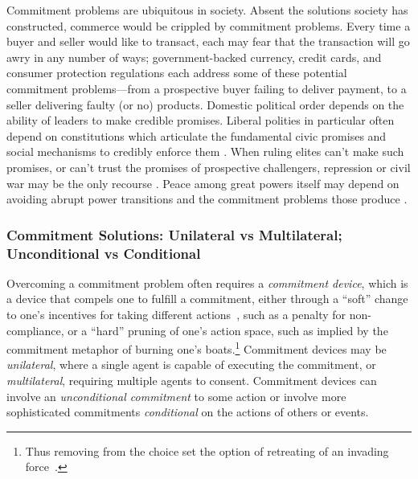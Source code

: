 \documentclass[11pt, a4paper, logo, onecolumn, nonumbering]{deepmind}
\newcommand{\bnote}[1]{}
\begin{document}
Commitment problems are ubiquitous in society. Absent the solutions society has constructed, commerce would be crippled by commitment problems. Every time a buyer and seller would like to transact, each may fear that the transaction will go awry in any number of ways; government-backed currency, credit cards, and consumer protection regulations each address some of these potential commitment problems---from a prospective buyer failing to deliver payment, to a seller delivering faulty (or no) products. %
Domestic political order depends on the ability of leaders to make credible promises. Liberal polities in particular often depend on constitutions which articulate the fundamental civic promises and social mechanisms to credibly enforce them \cite{acemoglu2012nations, north2009violence}.
When ruling elites can't make such promises, or can't trust the promises of prospective challengers, repression or civil war may be the only recourse \cite{fearon1998commitment, fearon2004some}.
 Peace among great powers itself may depend on avoiding abrupt power transitions and the commitment problems those produce \cite{powell1999shadow}.%
\bnote{Is the above too intense? Too much "political order" and war? Someone want to suggest how to lighten the mood?} 




\subsubsection{Commitment Solutions: Unilateral vs Multilateral; Unconditional vs Conditional}
\bnote{Integrate this reference: One device is {\it unilateral commitments}~\cite{magenau1988dual,conitzer2004computing} }
Overcoming a commitment problem often requires a {\it commitment device}, which is a device that compels one to fulfill a commitment, either through a ``soft'' change to one's incentives for taking different actions~\cite{snijders1996trust,bryan2010commitment}, such as a penalty for non-compliance, or a ``hard'' pruning of one's action space, such as implied by the commitment metaphor of burning one's boats.\footnote{Thus removing from the choice set the option of retreating of an invading force~\cite{reynolds1959burning}.}
Commitment devices may be \textit{unilateral}, where a single agent is capable of executing the commitment, or \textit{multilateral}, requiring multiple agents to consent. Commitment devices can involve an \textit{unconditional commitment} to some action or involve more sophisticated commitments \textit{conditional} on the actions of others or events. 
\end{document}
